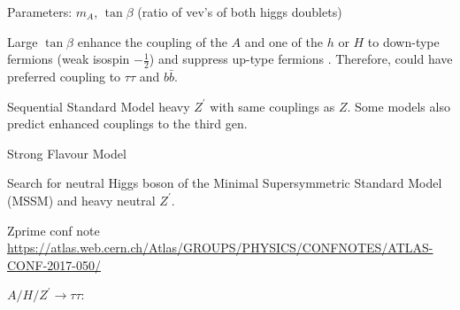 Parameters: $m_A$, $\tan\beta$ (ratio of vev's of both higgs doublets)

Large $\tan\beta$ enhance the coupling of the $A$ and one of the $h$ or $H$ to
down-type fermions (weak isospin $-\frac{1}{2}$) and suppress up-type fermions
\cite{susy}. Therefore, could have preferred coupling to $\tau\tau$ and
$b\bar{b}$.

Sequential Standard Model heavy $Z^\prime$ with same couplings as $Z$.
Some models also predict enhanced couplings to the third gen.

Strong Flavour Model



Search for neutral Higgs boson of the Minimal Supersymmetric Standard Model
(MSSM) and heavy neutral $Z^\prime$.





\cite{zprimeana}

Zprime conf note
\url{https://atlas.web.cern.ch/Atlas/GROUPS/PHYSICS/CONFNOTES/ATLAS-CONF-2017-050/}


$A/H/Z^\prime \to \tau\tau$:


